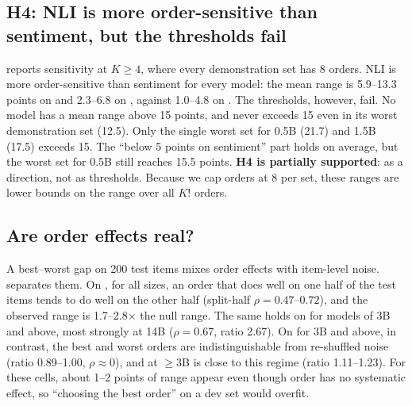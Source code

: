 \subsection{H4: NLI is more order-sensitive than sentiment, but the thresholds fail}
\label{sec:h4}



 reports sensitivity at $K\geq4$, where every demonstration set has 8 orders.
NLI is more order-sensitive than sentiment for every model: the mean range is 5.9--13.3 points on \mnli and 2.3--6.8 on \rte, against 1.0--4.8 on \sst.
The thresholds, however, fail.
No model has a mean \mnli range above 15 points, and \rte never exceeds 15 even in its worst demonstration set (12.5).
Only the single worst \mnli set for 0.5B (21.7) and 1.5B (17.5) exceeds 15.
The ``below 5 points on sentiment'' part holds on average, but the worst \sst set for 0.5B still reaches 15.5 points.
{\bf H4 is partially supported}: as a direction, not as thresholds.
Because we cap orders at 8 per set, these ranges are lower bounds on the range over all $K!$ orders.

\subsection{Are order effects real?}
\label{sec:reliability}



A best--worst gap on 200 test items mixes order effects with item-level noise.
 separates them.
On \mnli, for all sizes, an order that does well on one half of the test items tends to do well on the other half (split-half $\rho=0.47$--$0.72$), and the observed range is 1.7--2.8$\times$ the null range.
The same holds on \samsum for models of 3B and above, most strongly at 14B ($\rho=0.67$, ratio 2.67).
On \sst for 3B and above, in contrast, the best and worst orders are indistinguishable from re-shuffled noise (ratio 0.89--1.00, $\rho\approx0$), and \rte at $\geq$3B is close to this regime (ratio 1.11--1.23).
For these cells, about 1--2 points of range appear even though order has no systematic effect, so ``choosing the best order'' on a dev set would overfit.



